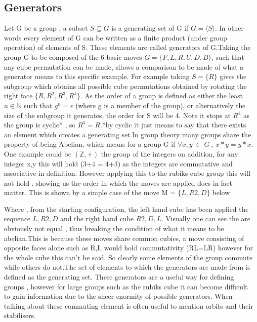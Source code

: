 \documentclass{article}
\begin{document}
\subsection{Generators}
Let G be a group , a subset $S\subseteq G$ is a generating set of G if $G =\langle S\rangle $. In other words every element of G can be written as a finite product (under group operation)  of elements of S. These elements are called generators of G.Taking the group G to be composed of the 6 basic moves  $G= \{{F,L,R,U,D,B}\}$, such that  any cube permutation can be made, allows  a comparison to be made of what a generator means to this specific example.  For example taking $S=\{R\}$ gives the subgroup which obtains all possible cube permutations obtained by rotating the right face $\{R,R^2,R^3,R^4\}$. As the order of a group is defined as either the least $n \in \mathbb{N}$ such that $g^n = \epsilon$ (where g is a member of the group),  or alternatively the size of the subgroup it generates, the order for S will be 4. Note it stops at $R^4$ as the group is cyclic* , so $R^5= R$.*by cyclic it just means to say that there exists an element which creates a generating set.\newline In group theory many groups share the property of being Abelian, which means for a group G if $\forall x,y\ \in\ G\ ,\ x*y=y*x$. One example could be $(\mathbb{Z},+)$ the group of the integers on addition, for any integer x,y this will hold (3+4 = 4+3) as the integers are commutative and associative in definition.
However applying this to the rubiks cube group this will not hold , showing us the order in which the moves are applied does in fact matter. This is shown by a simple case of the move M = $\{L,R2,D\}$ below

\begin{figure}[h]
\centering
  \RubikCubeSolved%
  \RubikCubeSolved%
  \hspace{.4cm}
\end{figure}
Where , from the starting configuration, the left hand cube has been applied the sequence ${L,R2,D}$ and the right hand cube ${R2,D,L}$. Visually one can see the are obviously not equal , thus breaking the condition of what it means to be abelian.This is because these moves share common cubies, a move consisting of opposite faces alone such as R,L would hold commutativity (RL=LR) however for the whole cube this can't be said. So clearly some elements of the group commute while others do not.\newline The set of elements to which the generators are made from is defined as the generating set. These generators are a useful way for defining groups , however for large groups such as the rubiks cube it can become difficult to gain information due to the sheer enormity of possible generators. When talking about these commuting element is often useful to mention orbits and their stabilisers. 
\end{document}
